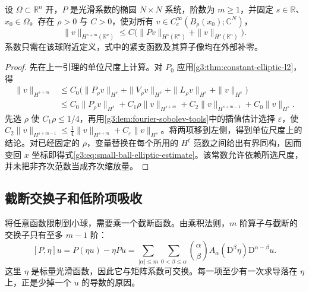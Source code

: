 \begin{proposition}\label{g3:prop:frozen-coefficient-apriori}
	设 \(\Omega\subset\mathbb R^n\) 开，\(P\) 是光滑系数的椭圆 \(N\times N\) 系统，阶数为 \(m\ge1\)，并固定 \(s\in\mathbb R\)、\(x_0\in\Omega\)。存在 \(\rho>0\) 与 \(C>0\)，使对所有 \(v\in C_c^\infty(B_\rho(x_0);\mathbb C^N)\)，
	\begin{equation}\label{g3:eq:small-ball-elliptic-estimate}
		\|v\|_{H^{s+m}(\mathbb R^n)}
		\le C\bigl(\|Pv\|_{H^s(\mathbb R^n)}+\|v\|_{H^s(\mathbb R^n)}\bigr).
	\end{equation}
	系数只需在该球附近定义，式中的紧支函数及其算子像均在外部补零。
\end{proposition}
\begin{proof}
	先在上一引理的单位尺度上计算。对 \(P_0\) 应用\cref{g3:thm:constant-elliptic-l2}，得
	\[
	\begin{aligned}
		\|v\|_{H^{s+m}}
		&\le C_0\bigl(\|P_\rho v\|_{H^s}+\|V_\rho v\|_{H^s}
		+\|L_\rho v\|_{H^s}+\|v\|_{H^s}\bigr)\\
		&\le C_0\|P_\rho v\|_{H^s}+C_1\rho\|v\|_{H^{s+m}}
		+C_2\|v\|_{H^{s+m-1}}+C_0\|v\|_{H^s}.
	\end{aligned}
	\]
	先选 \(\rho\) 使 \(C_1\rho\le1/4\)，再用\cref{g3:lem:fourier-sobolev-tools}中的插值估计选择 \(\varepsilon\)，使
	\(C_2\|v\|_{H^{s+m-1}}\le\tfrac14\|v\|_{H^{s+m}}+C_\varepsilon\|v\|_{H^s}\)。将两项移到左侧，得到单位尺度上的结论。对已经固定的 \(\rho\)，变量替换在每个所用的 \(H^t\) 范数之间给出有界同构，因而变回 \(x\) 坐标即得式\eqref{g3:eq:small-ball-elliptic-estimate}。该常数允许依赖所选尺度，并未把非齐次范数当成齐次缩放量。
\end{proof}

\subsection{截断交换子和低阶项吸收}
\label{g3:subsec:1203:02}
将任意函数限制到小球，需要乘一个截断函数。由乘积法则，\(m\) 阶算子与截断的交换子只有至多 \(m-1\) 阶：
\begin{equation}\label{g3:eq:localized-commutator}
	[P,\eta]u=P(\eta u)-\eta Pu
	=\sum_{|\alpha|\le m}
	\sum_{0<\beta\le\alpha}\binom\alpha\beta
	A_\alpha(\mathrm D^\beta\eta)\mathrm D^{\alpha-\beta}u.
\end{equation}
这里 \(\eta\) 是标量光滑函数，因此它与矩阵系数可交换。每一项至少有一次求导落在 \(\eta\) 上，正是少掉一个 \(u\) 的导数的原因。


